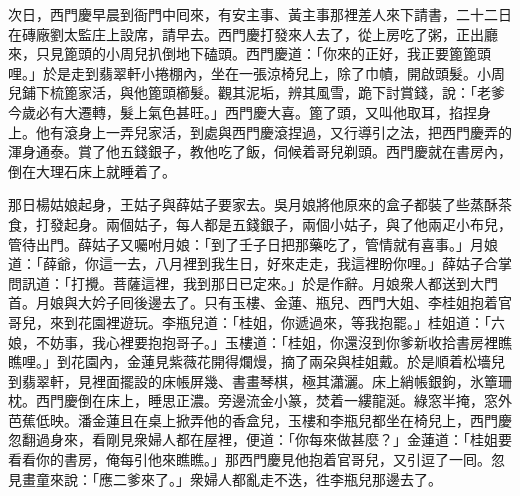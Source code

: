 次日，西門慶早晨到衙門中囘來，有安主事、黃主事那裡差人來下請書，二十二日在磚廠劉太監庄上設席，請早去。西門慶打發來人去了，從上房吃了粥，正出廳來，只見篦頭的小周兒扒倒地下磕頭。西門慶道：「你來的正好，我正要篦篦頭哩。」於是走到翡翠軒小捲棚內，坐在一張涼椅兒上，除了巾幘，開啟頭髮。小周兒鋪下梳篦家活，與他篦頭櫛髮。觀其泥垢，辨其風雪，跪下討賞錢，說：「老爹今歲必有大遷轉，髮上氣色甚旺。」西門慶大喜。篦了頭，又叫他取耳，掐捏身上。他有滾身上一弄兒家活，到處與西門慶滾捏過，又行導引之法，把西門慶弄的渾身通泰。賞了他五錢銀子，教他吃了飯，伺候着哥兒剃頭。西門慶就在書房內，倒在大理石床上就睡着了。

那日楊姑娘起身，王姑子與薛姑子要家去。吳月娘將他原來的盒子都裝了些蒸酥茶食，打發起身。兩個姑子，每人都是五錢銀子，兩個小姑子，與了他兩疋小布兒，管待出門。薛姑子又囑咐月娘：「到了壬子日把那藥吃了，管情就有喜事。」月娘道：「薛爺，你這一去，八月裡到我生日，好來走走，我這裡盼你哩。」薛姑子合掌問訊道：「打攪。菩薩這裡，我到那日已定來。」於是作辭。月娘衆人都送到大門首。月娘與大妗子囘後邊去了。只有玉樓、金蓮、瓶兒、西門大姐、李桂姐抱着官哥兒，來到花園裡遊玩。李瓶兒道：「桂姐，你遞過來，等我抱罷。」桂姐道：「六娘，不妨事，我心裡要抱抱哥子。」玉樓道：「桂姐，你還沒到你爹新收拾書房裡瞧瞧哩。」到花園內，金蓮見紫薇花開得爛熳，摘了兩朶與桂姐戴。{}於是順着松墻兒到翡翠軒，見裡面擺設的床帳屏幾、書畫琴棋，極其瀟灑。床上綃帳銀鉤，氷簟珊枕。西門慶倒在床上，睡思正濃。旁邊流金小篆，焚着一縷龍涎。綠窓半掩，窓外芭蕉低映。潘金蓮且在桌上掀弄他的香盒兒，玉樓和李瓶兒都坐在椅兒上，西門慶忽翻過身來，看剛見衆婦人都在屋裡，便道：「你每來做甚麼？」金蓮道：「桂姐要看看你的書房，俺每引他來瞧瞧。」那西門慶見他抱着官哥兒，又引逗了一囘。忽見畫童來說：「應二爹來了。」衆婦人都亂走不迭，徃李瓶兒那邊去了。

